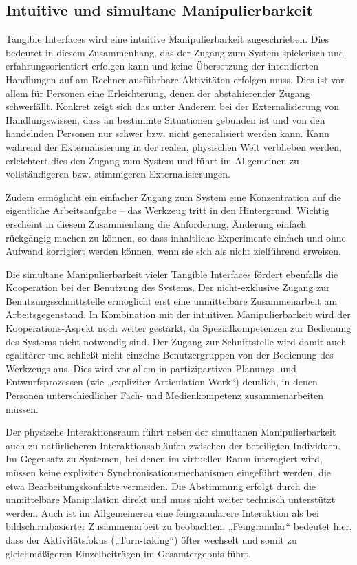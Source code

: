 \subsection{Intuitive und simultane Manipulierbarkeit} %
\label{sub:intuitive_und_simultane_manipulierbarkeit}

Tangible Interfaces wird eine intuitive Manipulierbarkeit zugeschrieben. Dies bedeutet in diesem Zusammenhang, das der Zugang zum System spielerisch und erfahrungsorientiert erfolgen kann und keine Übersetzung der intendierten Handlungen auf am Rechner ausführbare Aktivitäten erfolgen muss. Dies ist vor allem für Personen eine Erleichterung, denen der abstahierender Zugang schwerfällt. Konkret zeigt sich das unter Anderem bei der Externalisierung von Handlungswissen, dass an bestimmte Situationen gebunden ist und von den handelnden Personen nur schwer bzw. nicht generalisiert werden kann. Kann während der Externalisierung in der realen, physischen Welt verblieben werden, erleichtert dies den Zugang zum System und führt im Allgemeinen zu vollständigeren bzw. stimmigeren Externalisierungen.

Zudem ermöglicht ein einfacher Zugang zum System eine Konzentration auf die eigentliche Arbeitsaufgabe -- das Werkzeug tritt in den Hintergrund. Wichtig erscheint in diesem Zusammenhang die Anforderung, Änderung einfach rückgängig machen zu können, so dass inhaltliche Experimente einfach und ohne Aufwand korrigiert werden können, wenn sie sich als nicht zielführend erweisen.

Die simultane Manipulierbarkeit vieler Tangible Interfaces fördert ebenfalls die Kooperation bei der Benutzung des Systems. Der nicht-exklusive Zugang zur Benutzungsschnittstelle ermöglicht erst eine unmittelbare Zusammenarbeit am Arbeitsgegenstand. In Kombination mit der intuitiven Manipulierbarkeit wird der Kooperations-Aspekt noch weiter gestärkt, da Spezialkompetenzen zur Bedienung des Systems nicht notwendig sind. Der Zugang zur Schnittstelle wird damit auch egalitärer und schließt nicht einzelne Benutzergruppen von der Bedienung des Werkzeugs aus. Dies wird vor allem in partizipartiven Planungs- und Entwurfsprozessen (wie „expliziter Articulation Work“) deutlich, in denen Personen unterschiedlicher Fach- und Medienkompetenz zusammenarbeiten müssen. 

Der physische Interaktionsraum führt neben der simultanen Manipulierbarkeit auch zu natürlicheren Interaktionsabläufen zwischen der beteiligten Individuen. Im Gegensatz zu Systemen, bei denen im virtuellen Raum interagiert wird, müssen keine expliziten Synchronisationsmechanismen eingeführt werden, die etwa Bearbeitungskonflikte vermeiden. Die Abstimmung erfolgt durch die unmittelbare Manipulation direkt und muss nicht weiter technisch unterstützt werden. Auch ist im Allgemeineren eine feingranularere Interaktion als bei bildschirmbasierter Zusammenarbeit zu beobachten. „Feingranular“ bedeutet hier, dass der Aktivitätsfokus („Turn-taking“) öfter wechselt und somit zu gleichmäßigeren Einzelbeiträgen im Gesamtergebnis führt.

